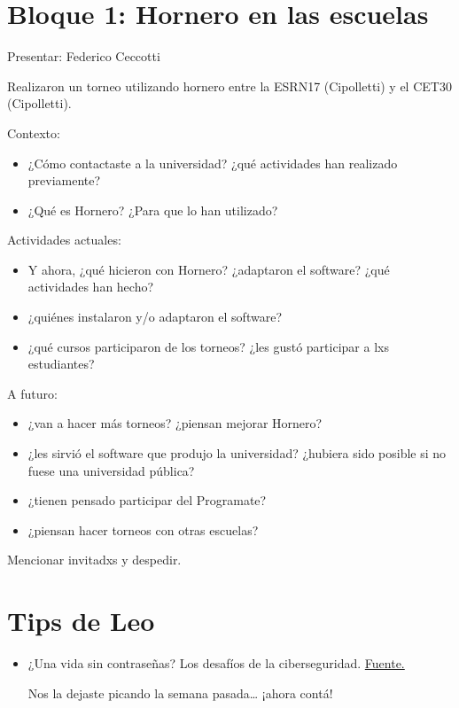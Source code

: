\documentclass[11pt]{article}
\begin{document}
\section{Bloque 1: Hornero en las escuelas}
\label{sec:org4f91972}
Presentar: Federico Ceccotti

Realizaron un torneo utilizando hornero entre la ESRN17 (Cipolletti) y el CET30 (Cipolletti).

Contexto:
\begin{itemize}
\item ¿Cómo contactaste a la universidad? ¿qué actividades han realizado previamente?
\item ¿Qué es Hornero? ¿Para que lo han utilizado?
\end{itemize}

Actividades actuales:
\begin{itemize}
\item Y ahora, ¿qué hicieron con Hornero? ¿adaptaron el software? ¿qué actividades han hecho?
\item ¿quiénes instalaron y/o adaptaron el software?
\item ¿qué cursos participaron de los torneos? ¿les gustó participar a lxs estudiantes?
\end{itemize}

A futuro:
\begin{itemize}
\item ¿van a hacer más torneos? ¿piensan mejorar Hornero?
\item ¿les sirvió el software que produjo la universidad? ¿hubiera sido posible si no fuese una universidad pública?
\item ¿tienen pensado participar del Programate?
\item ¿piensan hacer torneos con otras escuelas?
\end{itemize}

Mencionar invitadxs y despedir.

\section{Tips de Leo}
\label{sec:org76e5dc3}
\begin{itemize}
\item ¿Una vida sin contraseñas? Los desafíos de la ciberseguridad. \href{https://tn.com.ar/tecno/internet/2023/09/24/una-vida-sin-contrasenas-los-desafios-de-la-ciberseguridad/}{Fuente.}

Nos la dejaste picando la semana pasada\ldots{} ¡ahora contá! 
\end{itemize}
\end{document}

